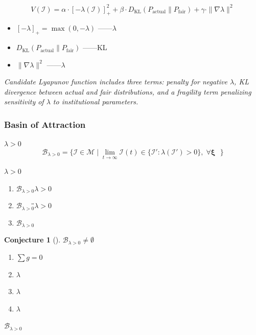 \documentclass[12pt,a4paper]{article}
\newtheorem{conjecture}[theorem]{Conjecture}
\theoremstyle{remark}
\newcommand{\B}{\mathcal{B}}
\begin{document}
\begin{equation}
    V(\mathcal{I}) = \alpha \cdot [-\lambda(\mathcal{I})]_+^2 + \beta \cdot D_{\text{KL}}(P_{\text{actual}} \| P_{\text{fair}}) + \gamma \cdot \|\nabla \lambda\|^2
\end{equation}


\begin{itemize}
    \item $[-\lambda]_+ = \max(0, -\lambda)$ ——$\lambda$
    \item $D_{\text{KL}}(P_{\text{actual}} \| P_{\text{fair}})$ ——KL
    \item $\|\nabla \lambda\|^2$ ——$\lambda$
\end{itemize}

\medskip
\noindent\textit{Candidate Lyapunov function includes three terms: penalty for negative $\lambda$, KL divergence between actual and fair distributions, and a fragility term penalizing sensitivity of $\lambda$ to institutional parameters.}

\subsubsection{ Basin of Attraction}

$\lambda > 0$\textbf{}
\begin{equation}
    \B_{\lambda>0} = \{\mathcal{I} \in \mathcal{M} \mid \lim_{t \to \infty} \mathcal{I}(t) \in \{\mathcal{I}' : \lambda(\mathcal{I}') > 0\}, \;\forall \boldsymbol{\xi} \text{ }\}
\end{equation}

$\lambda > 0$


\begin{enumerate}[label=(\arabic*)]
    \item $\B_{\lambda>0}$\textit{}$\lambda > 0$
    \item $\B_{\lambda>0}$\"\"$\lambda > 0$
    \item $\B_{\lambda>0}$
\end{enumerate}

\begin{conjecture}[]
$\B_{\lambda>0} \neq \emptyset$\textbf{}
\begin{enumerate}[label=(\alph*)]
    \item $\sum g = 0$
    \item $\lambda$
    \item $\lambda$
    \item $\lambda$
\end{enumerate}
$\B_{\lambda>0}$
\end{conjecture}
\end{document}
